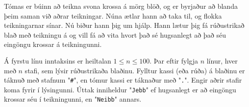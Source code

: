 Tómas er búinn að teikna svona krossa á mörg blöð, og er byrjaður að blanda
þeim saman við aðrar teikningar. Núna ætlar hann að taka til, og flokka
teikningarnar sínar. Nú biður hann þig um hjálp. Hann lætur þig fá rúðustrikað
blað með teikningu á og vill fá að vita hvort það sé hugsanlegt að það séu
eingöngu krossar á teikningunni.

Á fyrstu línu inntaksins er heiltalan $1 \leq n \leq 100$. Þar eftir fylgja $n$
línur, hver með $n$ stafi, sem lýsir rúðustrikaða blaðinu. Fylltur kassi (eða
rúða) á blaðinu er táknuð með stafnum "\texttt{#}", en tómur kassi
er táknaður með "\texttt{.}". Engir aðrir stafir koma fyrir í
lýsingunni. Úttak inniheldur "\texttt{Jebb}" ef hugsanlegt er að
eingöngu krossar séu í teikningunni, en "\texttt{Neibb}" annars.

